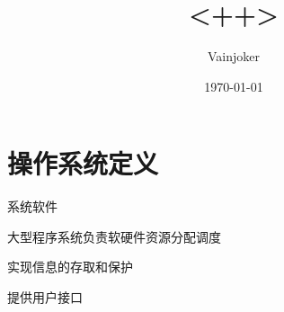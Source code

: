 \documentclass{article}
\title{<++>}
\author{Vainjoker}
\date{\today}
\begin{document}
    \maketitle
    
    \section{操作系统定义}%
        
    系统软件

    大型程序系统负责软硬件资源分配调度

    实现信息的存取和保护

    提供用户接口
    
\end{document}
